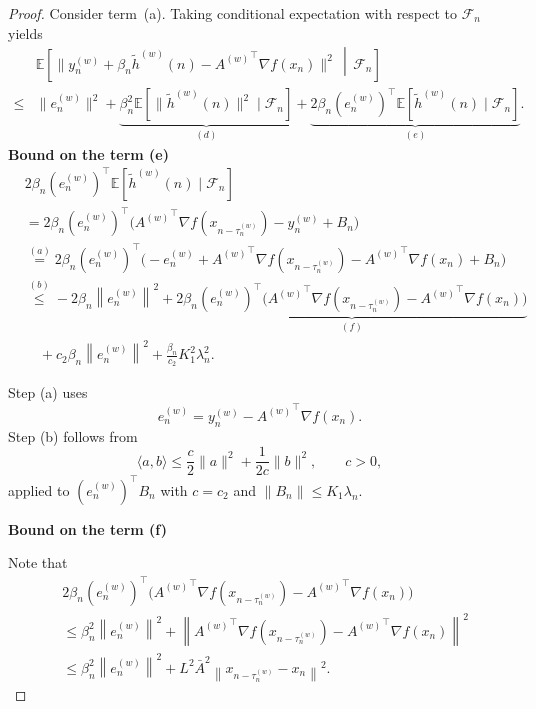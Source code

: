 \documentclass[10pt,a4paper]{amsart}
\newcommand{\norm}[1]{\left\lVert #1 \right\rVert}
\begin{document}
\begin{proof}
Consider term~(a). Taking conditional expectation with respect to
$\mathcal{F}_n$ yields
\begin{equation*}
\begin{split}
    &\mathbb{E}\!\left[
    \big\|
    y_n^{(w)} + \beta_n \widetilde{h}^{(w)}(n)
    -
    {A^{(w)}}^\top \nabla f(x_n)
    \big\|^2
    \,\middle|\,
    \mathcal{F}_n
    \right]
    \\[0.3em]
    \le{}&
    \|e_n^{(w)}\|^2
    +
    \underbrace{\beta_n^2
    \mathbb{E}\!\left[
    \|\widetilde{h}^{(w)}(n)\|^2
    \mid
    \mathcal{F}_n
    \right]}_{(d)}
    +
    \underbrace{2\beta_n (e_n^{(w)})^\top
    \mathbb{E}\!\left[
    \widetilde{h}^{(w)}(n)
    \mid
    \mathcal{F}_n
    \right]}_{(e)}.
\end{split}
\end{equation*}
\textbf{Bound on the term (e)}
\begin{equation*}
\begin{split}
& 2\beta_n (e_n^{(w)})^\top
\mathbb{E}\!\left[
\widetilde{h}^{(w)}(n)
\mid \mathcal{F}_n
\right] \\
&= 2 \beta_n (e_n^{(w)})^\top
\big(
{A^{(w)}}^\top \nabla f(x_{n-\tau_n^{(w)}})
- y_n^{(w)}
+ B_n
\big) \\
&\overset{(a)}{=}
2 \beta_n (e_n^{(w)})^\top
\big(
- e_n^{(w)}
+ {A^{(w)}}^\top \nabla f(x_{n-\tau_n^{(w)}})
- {A^{(w)}}^\top \nabla f(x_n)
+ B_n
\big) \\
&\overset{(b)}{\le}
- 2 \beta_n \norm{e_n^{(w)}}^2
+ \underbrace{
2 \beta_n (e_n^{(w)})^\top
\big(
{A^{(w)}}^\top \nabla f(x_{n-\tau_n^{(w)}})
- {A^{(w)}}^\top \nabla f(x_n)
\big)
}_{(f)} \\
&\quad + c_2 \beta_n \norm{e_n^{(w)}}^2
+ \frac{\beta_n}{c_2} K_1^2 \lambda_n^2.
\end{split}
\end{equation*}

Step (a) uses
\[
e_n^{(w)} = y_n^{(w)} - {A^{(w)}}^\top \nabla f(x_n).
\]
Step (b) follows from
\[
\langle a,b\rangle \le \frac{c}{2}\|a\|^2 + \frac{1}{2c}\|b\|^2, \qquad c>0,
\]
applied to $(e_n^{(w)})^\top B_n$ with $c=c_2$ and $\|B_n\|\le K_1 \lambda_n$.

\textbf{Bound on the term (f)}

Note that
\begin{equation}
\begin{split}
& 2 \beta_n (e_n^{(w)})^\top
\big(
{A^{(w)}}^\top \nabla f(x_{n-\tau_n^{(w)}})
- {A^{(w)}}^\top \nabla f(x_n)
\big) \\
&\le 
\beta_n^2 \norm{e_n^{(w)}}^2
+ \norm{
{A^{(w)}}^\top \nabla f(x_{n-\tau_n^{(w)}})
- {A^{(w)}}^\top \nabla f(x_n)
}^2 \\
&\le 
\beta_n^2 \norm{e_n^{(w)}}^2
+ L^2 \bar{A}^2 \norm{x_{n-\tau_n^{(w)}} - x_n}^2.
\end{split}
\label{eq:f1}
\end{equation}


\end{proof}
\end{document}
